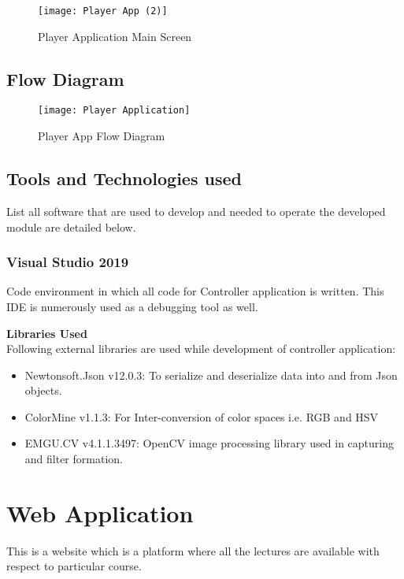 \begin{figure}[h]
  \centering
  \texttt{[image: Player App (2)]}
  \caption{Player Application Main Screen}
\end{figure}

\newpage
\subsection{Flow Diagram}

\begin{figure}[h]
  \centering
  \texttt{[image: Player Application]}
  \caption{Player App Flow Diagram}
\end{figure}

\subsection{Tools and Technologies used}
List all software that are used to develop and needed to operate the developed module are detailed below.

\subsubsection{Visual Studio 2019}
Code environment in which all code for Controller application is written. This IDE is numerously used as a debugging tool as well.

\textbf{Libraries Used}\\
Following external libraries are used while development of controller application:

\begin{itemize}

\item Newtonsoft.Json v12.0.3: To serialize and deserialize data into and from Json objects.
\item ColorMine v1.1.3: For Inter-conversion of color spaces i.e. RGB and HSV
\item EMGU.CV v4.1.1.3497: OpenCV image processing library used in capturing and filter formation.

\end{itemize}

\section{Web Application}
This is a website which is a platform where all the lectures are available with respect to particular course.

